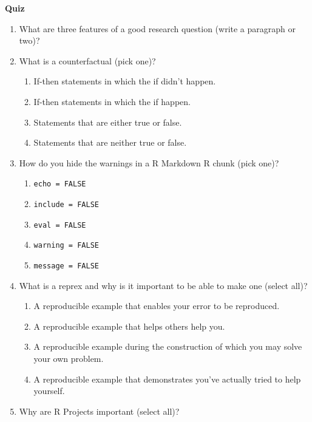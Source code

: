 \documentclass[
]{book}
\providecommand{\tightlist}{%
  \setlength{\itemsep}{0pt}\setlength{\parskip}{0pt}}
\begin{document}
\textbf{Quiz}

\begin{enumerate}
\def\labelenumi{\arabic{enumi}.}
\tightlist
\item
  What are three features of a good research question (write a paragraph or two)?
\item
  What is a counterfactual (pick one)?

  \begin{enumerate}
  \def\labelenumii{\alph{enumii}.}
  \tightlist
  \item
    If-then statements in which the if didn't happen.
  \item
    If-then statements in which the if happen.
  \item
    Statements that are either true or false.
  \item
    Statements that are neither true or false.
  \end{enumerate}
\item
  How do you hide the warnings in a R Markdown R chunk (pick one)?

  \begin{enumerate}
  \def\labelenumii{\alph{enumii}.}
  \tightlist
  \item
    \texttt{echo\ =\ FALSE}
  \item
    \texttt{include\ =\ FALSE}
  \item
    \texttt{eval\ =\ FALSE}
  \item
    \texttt{warning\ =\ FALSE}
  \item
    \texttt{message\ =\ FALSE}
  \end{enumerate}
\item
  What is a reprex and why is it important to be able to make one (select all)?

  \begin{enumerate}
  \def\labelenumii{\alph{enumii}.}
  \tightlist
  \item
    A reproducible example that enables your error to be reproduced.
  \item
    A reproducible example that helps others help you.
  \item
    A reproducible example during the construction of which you may solve your own problem.
  \item
    A reproducible example that demonstrates you've actually tried to help yourself.
  \end{enumerate}
\item
  Why are R Projects important (select all)?


\end{enumerate}
\end{document}

